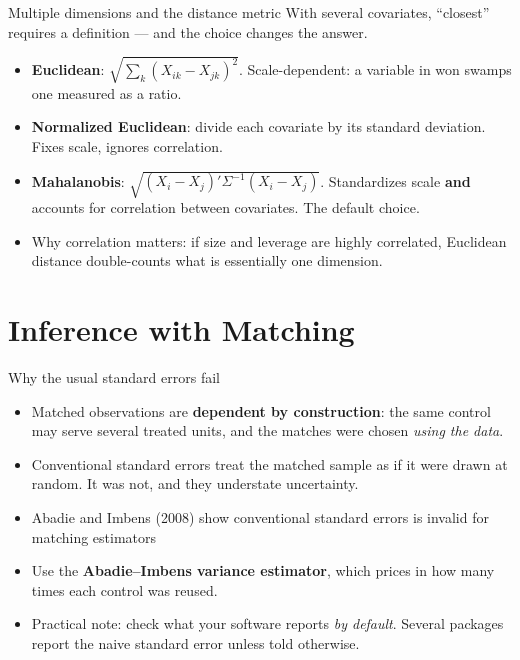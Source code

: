 \documentclass[
  11pt,
  ignorenonframetext,
  aspectratio=169,
]{beamer}
\providecommand{\tightlist}{%
  \setlength{\itemsep}{0pt}\setlength{\parskip}{0pt}}
\begin{document}
\begin{frame}{Multiple dimensions and the distance metric}
\protect{}\label{multiple-dimensions-and-the-distance-metric}
With several covariates, ``closest'' requires a definition --- and the
choice changes the answer.

\begin{itemize}
\tightlist
\item
  \textbf{Euclidean}: \(\sqrt{\sum_k (X_{ik}-X_{jk})^2}\).
  Scale-dependent: a variable in won swamps one measured as a ratio.
\item
  \textbf{Normalized Euclidean}: divide each covariate by its standard
  deviation. Fixes scale, ignores correlation.
\item
  \textbf{Mahalanobis}: \(\sqrt{(X_i - X_j)' \Sigma^{-1}(X_i-X_j)}\).
  Standardizes scale \textbf{and} accounts for correlation between
  covariates. The default choice.
\end{itemize}

\vspace{0.3em}

\begin{itemize}
\tightlist
\item
  Why correlation matters: if size and leverage are highly correlated,
  Euclidean distance double-counts what is essentially one dimension.
\end{itemize}
\end{frame}

\section{Inference with Matching}\label{inference-with-matching}

\begin{frame}{Why the usual standard errors fail}
\protect{}\label{why-the-usual-standard-errors-fail}
\begin{itemize}
\tightlist
\item
  Matched observations are \textbf{dependent by construction}: the same
  control may serve several treated units, and the matches were chosen
  \emph{using the data}.
\item
  Conventional standard errors treat the matched sample as if it were
  drawn at random. It was not, and they understate uncertainty.
\item
  Abadie and Imbens (2008) show conventional standard errors is invalid
  for matching estimators
\item
  Use the \textbf{Abadie--Imbens variance estimator}, which prices in
  how many times each control was reused.
\item
  Practical note: check what your software reports \emph{by default}.
  Several packages report the naive standard error unless told
  otherwise.
\end{itemize}
\end{frame}
\end{document}
